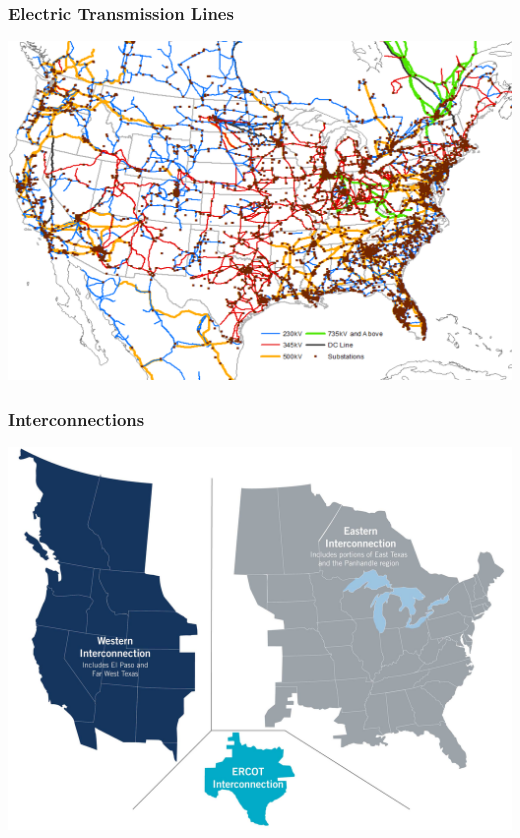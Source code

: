 \documentclass[14pt, unknownkeysallowed]{beamer}
\begin{document}
\begin{frame}
\frametitle{Electric Transmission Lines}
{\centering
\includegraphics[height=.82\textheight]{xgridPlusSubs} {\tiny \cite{NAtransmissionMAP} }%

}
\end{frame}
\begin{frame}
\frametitle{Interconnections}
\begin{center}
\includegraphics[height=.8\textheight]{InternconnectionBranded}  {\tiny \cite{ercotInterconnections} }%
\end{center}

\end{frame}
\end{document}
